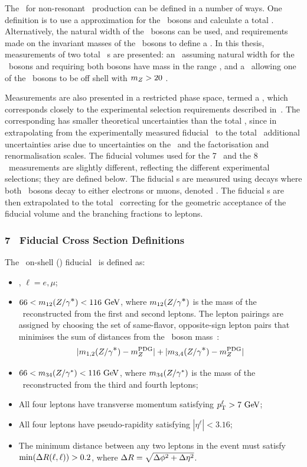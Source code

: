 The \cx\ for non-resonant \ZZ\ production can be defined in a number of
ways. One definition is to use a  approximation for the \Z\ bosons and
calculate a total \cx. Alternatively, the natural width of the \Z\
bosons can be used, and requirements made on the invariant masses of the \Z\
bosons to define a \cx. In this thesis, measurements of two total \ZZ\ \cx s
are presented: an \intro{on-shell} \cx\, assuming natural width for the
\Z\ bosons and requiring both bosons have mass in the range \sstooosZ, and a
\cx\ allowing one of the \Z\ bosons to be off shell with $m_{Z}>20$
\gev.

Measurements are also presented in a restricted phase space, termed a
, which corresponds closely to the experimental selection
requirements described in~\chap{ObjEventSelection}. The corresponding
\intro{fiducial \cx} has smaller theoretical uncertainties than the total \cx,
since in extrapolating from the experimentally measured
fiducial \cx\ to the total \cx\ additional uncertainties arise due to uncertainties on the \partDF\ and
the factorisation and renormalisation scales. The fiducial volumes used for the
7 \tev\ and the 8 \tev\ measurements are slightly different, reflecting the
different experimental selections; they are defined below. The fiducial
\cx s are measured using decays where both \Z\ bosons decay to either electrons
or muons, denoted \ZZllll. The fiducial
\cx s are then extrapolated to the total \cx\ correcting for
the geometric acceptance of the fiducial volume and the branching
fractions to leptons.

\subsubsection{7 \tev\ Fiducial Cross Section Definitions}

The \zzllll\ on-shell (\ZZ) fiducial \cx\ is defined as:

\begin{itemize}
\item{\ZorgZorglplmlplm, $\ell = e,\mu$;}
\item{ $66 < m_{12}(\Zorgv) <  116\GeV$, where $m_{12}(Z/\gamma^{\textstyle *})$ is
the mass of the \Z\ reconstructed from the first and second leptons.  The
lepton pairings are assigned by choosing the set of 
same-flavor, opposite-sign lepton pairs that minimises the sum of distances from
the \Z\ boson mass~\cite{PDG}:
\begin{equation}
|m_{1,2}(Z/\gamma^{\textstyle *}) - m_{Z}^{\rm PDG}| + |m_{3,4}(Z/\gamma^{\textstyle *}) - m_{Z}^{\rm PDG}|
\end{equation}
}
\item{ $66 < m_{34}(\Z/\gamma^*) <  116\GeV$, where $m_{34}(Z/\gamma^*)$ is
the mass of the \Z\ reconstructed from the third and fourth leptons;}
\item All four leptons have transverse momentum satisfying $\pT^{\ell} > 7\GeV$;
\item All four leptons have pseudo-rapidity satisfying $|\eta^{\ell}| < 3.16$;
\item{ The minimum distance between any two leptons in the event must satisfy
$\mathrm{min}(\Delta R(\ell,\ell)) > 0.2$, where $\Delta R = \sqrt{\Delta \phi^{2} +
\Delta \eta^{2}}$.}
\end{itemize}

